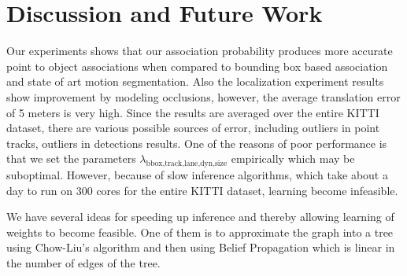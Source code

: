 \section{Discussion and Future Work}
\label{sec:conclusions}

Our experiments shows that our association probability produces more accurate
point to object associations when compared to bounding box based
association and state of art motion segmentation.
Also the localization experiment results show improvement by modeling occlusions, however, the average translation error of 5 meters is very high. Since the results are averaged over the entire KITTI dataset, there are various possible sources of error, including outliers in point tracks, outliers in detections results. 
One of the reasons of poor performance is that we set the parameters $\lambda_{\text{bbox,track,lane,dyn,size}}$ empirically which may be suboptimal. However, because of slow inference algorithms, which take about a day to run on 300 cores for the entire KITTI dataset, learning become infeasible.

We have several ideas for speeding up inference and thereby allowing learning
of weights to become feasible. One of them is to approximate the graph into a
tree using Chow-Liu's \cite{chow1968approximating} algorithm and then using
Belief Propagation which is linear in the number of edges of the tree.
